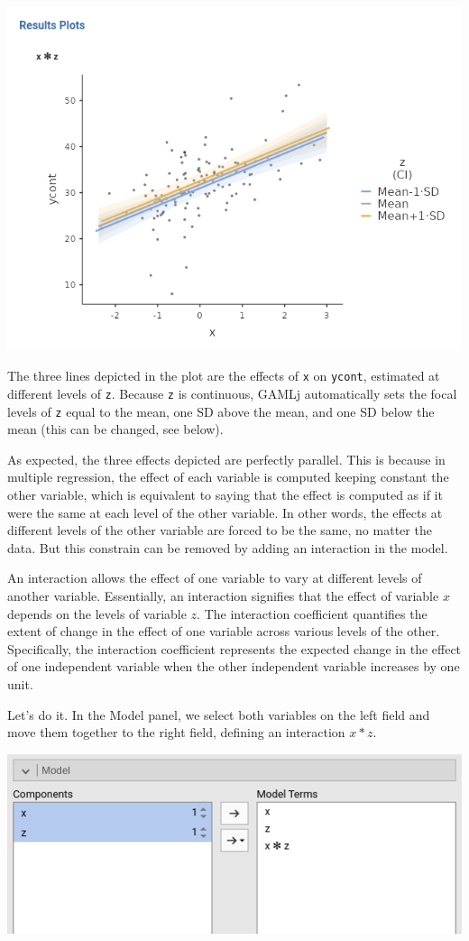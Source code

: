 \documentclass[
]{book}
\begin{document}
\includegraphics[width=0.9\linewidth]{bookletpics/2_output10}

The three lines depicted in the plot are the effects of \texttt{x} on \texttt{ycont}, estimated at different levels of \texttt{z}. Because \texttt{z} is continuous, {GAMLj} automatically sets the focal levels of \texttt{z} equal to the mean, one SD above the mean, and one SD below the mean (this can be changed, see below).

As expected, the three effects depicted are perfectly parallel. This is because in multiple regression, the effect of each variable is computed keeping constant the other variable, which is equivalent to saying that the effect is computed as if it were the same at each level of the other variable. In other words, the effects at different levels of the other variable are forced to be the same, no matter the data. But this constrain can be removed by adding an interaction in the model.

An interaction allows the effect of one variable to vary at different levels of another variable. Essentially, an interaction signifies that the effect of variable \(x\) depends on the levels of variable \(z\). The interaction coefficient quantifies the extent of change in the effect of one variable across various levels of the other. Specifically, the interaction coefficient represents the expected change in the effect of one independent variable when the other independent variable increases by one unit.

Let's do it. In the {Model} panel, we select both variables on the left field and move them together to the right field, defining an interaction \(x*z\).

\includegraphics[width=0.7\linewidth]{bookletpics/2_input11}
\end{document}
